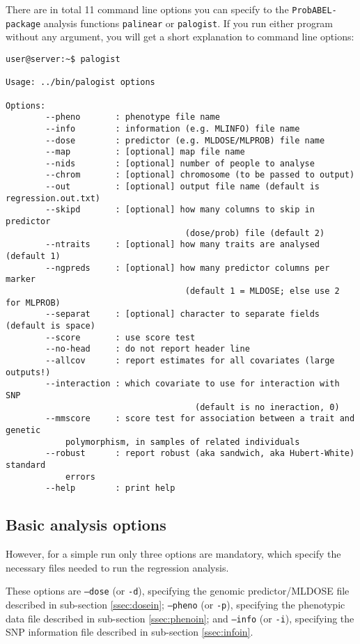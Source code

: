\documentclass[12pt,a4paper]{article}
\newcommand{\PA}{\texttt{ProbABEL-package}}
\begin{document}
There are in total 11 command line options you can specify to the
\PA{} analysis functions \texttt{palinear} or
\texttt{palogist}. If you run either program without any argument, you
will get a short explanation to command line options:
\begin{verbatim}
user@server:~$ palogist

Usage: ../bin/palogist options

Options:
		--pheno       : phenotype file name
		--info        : information (e.g. MLINFO) file name
		--dose        : predictor (e.g. MLDOSE/MLPROB) file name
		--map         : [optional] map file name
		--nids        : [optional] number of people to analyse
		--chrom       : [optional] chromosome (to be passed to output)
		--out         : [optional] output file name (default is regression.out.txt)
		--skipd       : [optional] how many columns to skip in predictor
								    (dose/prob) file (default 2)
		--ntraits     : [optional] how many traits are analysed (default 1)
		--ngpreds     : [optional] how many predictor columns per marker
								    (default 1 = MLDOSE; else use 2 for MLPROB)
		--separat     : [optional] character to separate fields (default is space)
		--score       : use score test
		--no-head     : do not report header line
		--allcov      : report estimates for all covariates (large outputs!)
		--interaction : which covariate to use for interaction with SNP
									  (default is no ineraction, 0)
		--mmscore     : score test for association between a trait and genetic
		    polymorphism, in samples of related individuals
		--robust      : report robust (aka sandwich, aka Hubert-White) standard
		    errors
		--help        : print help
\end{verbatim}


\subsection{Basic analysis options}
However, for a simple run only three options are mandatory, which
specify the necessary files needed to run the regression analysis.

These options are
\texttt{--dose} (or \texttt{-d}),
specifying the genomic predictor/MLDOSE file described in sub-section \ref{ssec:dosein};
\texttt{--pheno} (or \texttt{-p}),
specifying the phenotypic data file described in sub-section \ref{ssec:phenoin}; and
\texttt{--info} (or \texttt{-i}),
specifying the SNP information file described in sub-section \ref{ssec:infoin}.
\end{document}
